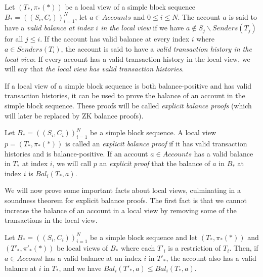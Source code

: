 \begin{defn}
  Let \((T_*, \pi_*(*))\) be a local view of a simple block sequence \(B_* = ((S_i,C_i))_{i=1}^N\), let \(a \in Accounts\) and \(0 \leq i \leq N\). The account \(a\) is said to have a \emph{valid balance at index \(i\) in the local view} if we have \(a \notin S_j \backslash Senders(T_j)\) for all \(j \leq i\). If the account has valid balance at every index \(i\) where \(a \in Senders(T_i)\), the account is said to have a \emph{valid transaction history in the local view}. If every account has a valid transaction history in the local view, we will say that \emph{the local view has valid transaction histories}.
\end{defn}

If a local view of a simple block sequence is both balance-positive and has valid transaction histories, it can be used to prove the balance of an account in the simple block sequence. These proofs will be called \emph{explicit balance proofs} (which will later be replaced by ZK balance proofs).

\begin{defn}
  Let \(B_* = ((S_i,C_i))_{i=1}^N\) be a simple block sequence. A local view \(p = (T_*, \pi_*(*))\) is called an \emph{explicit balance proof} if it has valid transaction histories and is balance-positive. If an account \(a \in Accounts\) has a valid balance in \(T_*\) at index \(i\), we will call \(p\) an \emph{explicit proof} that the balance of \(a\) in \(B_*\) at index \(i\) is \(Bal_i(T_*,a)\).
\end{defn}

 We will now prove some important facts about local views, culminating in a soundness theorem for explicit balance proofs. The first fact is that we cannot increase the balance of an account in a local view by removing some of the transactions in the local view.

\begin{prop}\label{theorem:balance-inequalities}
  Let \(B_* = ((S_i,C_i))_{i=1}^N\) be a simple block sequence and let \((T_*, \pi_*(*))\) and \((T'_*, \pi'_*(*))\) be local views of \(B_*\) where each \(T'_i\) is a restriction of \(T_i\). Then, if \(a \in Account\) has a valid balance at an index \(i\) in \(T'_*\), the account also has a valid balance at \(i\) in \(T_*\), and we have \(Bal_i(T'_*,a) \leq Bal_i(T_*,a).\)
\end{prop}

